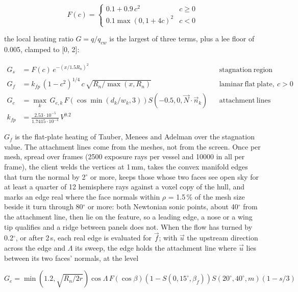 \documentclass[Orbiter Technical Reference.tex]{subfiles}
\begin{document}
\begin{sloppypar}
\[ F(c) = \left\{ \begin{array}{ll} 0.1 + 0.9\,c^{2} & c \ge 0 \\ 0.1\max(0, 1 + 4c)^{2} & c < 0 \end{array} \right. \]

\noindent
the local heating ratio $G = q/q_{cw}$ is the largest of three terms, plus a lee floor of 0.005, clamped to [0, 2]:

\begin{align*}
G_{s} &= F(c)\,e^{-(x/1.5R_{n})^{2}} && \mathrm{stagnation\ region}\\
G_{f} &= k_{fp}\,(1 - c^{2})^{1/4}\,c\,\sqrt{R_{n}/\max(x, R_{n})} && \mathrm{laminar\ flat\ plate},\ c > 0\\
G_{c} &= \max_{k}\,G_{e,k}\,F\left(\cos\min(d_{k}/w_{k}, 3)\right)S(-0.5, 0, \vec{N}\cdot\vec{n}_{k}) && \mathrm{attachment\ lines}\\
k_{fp} &= \frac{2.53\cdot10^{-5}}{1.7415\cdot10^{-4}}\,V^{0.2}
\end{align*}

\noindent
$G_{f}$ is the flat-plate heating of Tauber, Menees and Adelman \cite{tauber1987} over the stagnation value. The attachment lines come from the meshes, not from the screen. Once per mesh, spread over frames (2500 exposure rays per vessel and 10000 in all per frame), the client welds the vertices at 1\,mm, takes the convex manifold edges that turn the normal by 2$^{\circ}$ or more, keeps those whose two faces see open sky for at least a quarter of 12 hemisphere rays against a voxel copy of the hull, and marks an edge real where the face normals within $\rho$ = 1.5\,\% of the mesh size beside it turn through 80$^{\circ}$ or more: both Newtonian sonic points, about 40$^{\circ}$ from the attachment line, then lie on the feature, so a leading edge, a nose or a wing tip qualifies and a ridge between panels does not. When the flow has turned by 0.2$^{\circ}$, or after 2\,s, each real edge is evaluated for $\vec{f}$; with $\vec{u}$ the upstream direction across the edge and $\Lambda$ its sweep, the edge holds the attachment line where $\vec{u}$ lies between its two faces' normals, at the level

\[ G_{e} = \min\left(1.2, \sqrt{R_{n}/2r}\right)\cos\Lambda\,F(\cos\beta)\left(1 - S(0, 15^{\circ}, \beta_{f})\right)S(20^{\circ}, 40^{\circ}, m)\left(1 - s/3\right) \]


\end{sloppypar}
\end{document}
